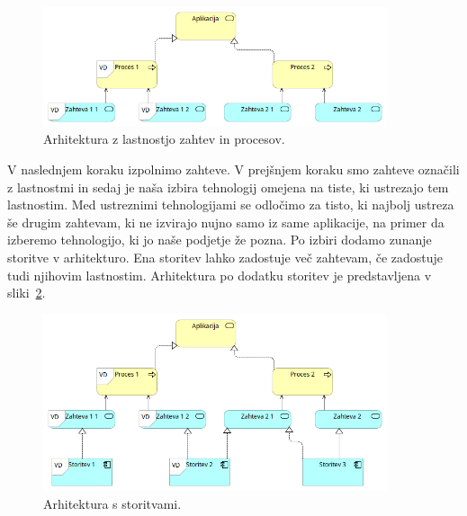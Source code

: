 \begin{figure}[H]
    \centering
    \includegraphics[width=0.9\textwidth]{img/gradnja/generic-arch-application-labels.png}
    \caption{Arhitektura z lastnostjo zahtev in procesov.}
    \label{fig:generic-arch-application-labels}
\end{figure}

V naslednjem koraku izpolnimo zahteve.
V prejšnjem koraku smo zahteve označili z lastnostmi in sedaj je naša
izbira tehnologij omejena na tiste, ki ustrezajo tem lastnostim.
Med ustreznimi tehnologijami se odločimo za tisto,
ki najbolj ustreza še drugim zahtevam, ki ne izvirajo nujno samo iz
same aplikacije, na primer da izberemo tehnologijo, ki jo naše podjetje
že pozna.
Po izbiri dodamo zunanje storitve v arhitekturo.
Ena storitev lahko zadostuje več zahtevam,
če zadostuje tudi njihovim lastnostim.
Arhitektura po dodatku storitev je predstavljena v sliki~\ref{fig:generic-services}.

\begin{figure}[H]
    \centering
    \includegraphics[width=0.9\textwidth]{img/gradnja/generic-services.png}
    \caption{Arhitektura s storitvami.}
    \label{fig:generic-services}
\end{figure}
